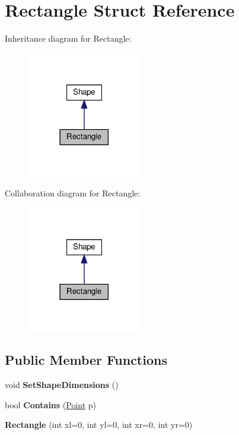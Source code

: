 \hypertarget{structRectangle}{}\section{Rectangle Struct Reference}
\label{structRectangle}


Inheritance diagram for Rectangle\+:\nopagebreak
\begin{figure}[H]
\begin{center}
\leavevmode
\includegraphics[width=141pt]{structRectangle__inherit__graph}
\end{center}
\end{figure}


Collaboration diagram for Rectangle\+:\nopagebreak
\begin{figure}[H]
\begin{center}
\leavevmode
\includegraphics[width=141pt]{structRectangle__coll__graph}
\end{center}
\end{figure}
\subsection*{Public Member Functions}
\begin{DoxyCompactItemize}
\item 
\mbox{\label{structRectangle_afda3a0efab405eb647361ad1edbd0e95}} 
void {\bfseries Set\+Shape\+Dimensions} ()
\item 
\mbox{\label{structRectangle_a0ea219073799a22f59de30421792e86b}} 
bool {\bfseries Contains} (\hyperlink{structPoint}{Point} p)
\item 
\mbox{\label{structRectangle_addb2bfa9829eaa920bebdcf0bebe9bc9}} 
{\bfseries Rectangle} (int xl=0, int yl=0, int xr=0, int yr=0)
\end{DoxyCompactItemize}
